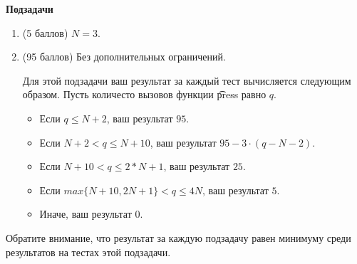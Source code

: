 \bf{Подзадачи}

\begin{enumerate}
\item (5 баллов) $N=3$. 
\item (95 баллов) Без дополнительных ограничений. 

Для этой подзадачи ваш результат за каждый тест вычисляется следующим образом. Пусть количесто вызовов функции \t{press} равно $q$. 

\begin{itemize}
\item Если $q \le N+2$, ваш результат $95$. 
\item Если $N+2 < q \le N+10$, ваш результат $95 - 3 \cdot (q - N - 2)$.
\item Если $N+10 < q \le 2* N+1$, ваш результат $25$. 
\item Если $max\{N+10, 2N+1\} < q \le 4N$, ваш результат $5$. 
\item Иначе, ваш результат $0$. 
\end{itemize}
\end{enumerate}

Обратите внимание, что результат за каждую подзадачу равен минимуму среди результатов на тестах этой подзадачи. 